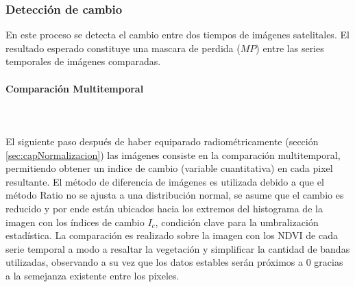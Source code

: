 \subsubsection{Detecci\'on de cambio}
En este proceso se detecta el cambio entre dos tiempos de im\'agenes satelitales. El resultado esperado constituye una mascara de perdida ($ MP $) entre las series temporales de im\'agenes comparadas. 
\paragraph{Comparaci\'on Multitemporal}\mbox{}\\\mbox{}\\
El siguiente paso despu\'es de haber equiparado radiom\'etricamente (secci\'on \ref{sec:capNormalizacion}) las im\'agenes consiste en la comparaci\'on multitemporal, permitiendo obtener un indice de cambio (variable cuantitativa) en cada pixel resultante. El m\'etodo de diferencia de im\'agenes es utilizada debido a que el m\'etodo Ratio no se ajusta a una distribuci\'on normal, se asume que el cambio es reducido y por ende est\'an ubicados hacia los extremos del histograma de la imagen con los \'indices de cambio $ I_{c} $, condici\'on clave para la umbralizaci\'on estad\'istica. La comparaci\'on es realizado sobre la imagen con los NDVI de cada serie temporal a modo a resaltar la vegetaci\'on y simplificar la cantidad de bandas utilizadas, observando a su vez que los datos estables ser\'an pr\'oximos a $ 0 $ gracias a la semejanza existente entre los pixeles. 
